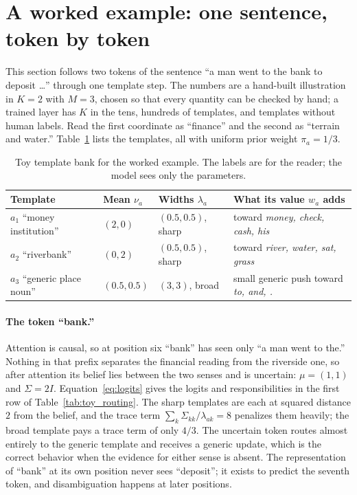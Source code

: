 \documentclass[11pt]{article}
\theoremstyle{definition}
\theoremstyle{remark}
\begin{document}
\section{A worked example: one sentence, token by token}
\label{sec:example}

This section follows two tokens of the sentence ``a man went to the bank to deposit \dots'' through one template step. The numbers are a hand-built illustration in $K=2$ with $M=3$, chosen so that every quantity can be checked by hand; a trained layer has $K$ in the tens, hundreds of templates, and templates without human labels. Read the first coordinate as ``finance'' and the second as ``terrain and water.'' Table~\ref{tab:toy_templates} lists the templates, all with uniform prior weight $\pi_a=1/3$.

\begin{table}[h]
\centering
\begin{tabular}{@{}llll@{}}
\toprule
Template & Mean $\nu_a$ & Widths $\lambda_a$ & What its value $w_a$ adds \\
\midrule
$a_1$ ``money institution'' & $(2,0)$ & $(0.5,0.5)$, sharp & toward \emph{money, check, cash, his} \\
$a_2$ ``riverbank'' & $(0,2)$ & $(0.5,0.5)$, sharp & toward \emph{river, water, sat, grass} \\
$a_3$ ``generic place noun'' & $(0.5,0.5)$ & $(3,3)$, broad & small generic push toward \emph{to, and, .} \\
\bottomrule
\end{tabular}
\caption{Toy template bank for the worked example. The labels are for the reader; the model sees only the parameters.}
\label{tab:toy_templates}
\end{table}

\paragraph{The token ``bank.''}
Attention is causal, so at position six ``bank'' has seen only ``a man went to the.'' Nothing in that prefix separates the financial reading from the riverside one, so after attention its belief lies between the two senses and is uncertain: $\mu=(1,1)$ and $\Sigma=2I$. Equation~\eqref{eq:logits} gives the logits and responsibilities in the first row of Table~\ref{tab:toy_routing}. The sharp templates are each at squared distance $2$ from the belief, and the trace term $\sum_k\Sigma_{kk}/\lambda_{ak}=8$ penalizes them heavily; the broad template pays a trace term of only $4/3$. The uncertain token routes almost entirely to the generic template and receives a generic update, which is the correct behavior when the evidence for either sense is absent. The representation of ``bank'' at its own position never sees ``deposit''; it exists to predict the seventh token, and disambiguation happens at later positions.
\end{document}
